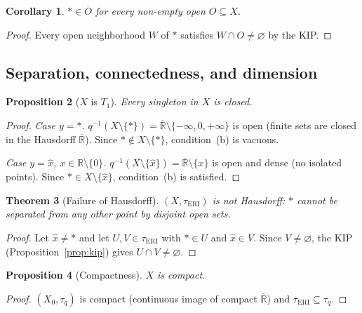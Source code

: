 \documentclass[11pt]{article}
\newtheorem{theorem}{Theorem}[section]
\newtheorem{proposition}[theorem]{Proposition}
\newtheorem{corollary}[theorem]{Corollary}
\theoremstyle{definition}
\theoremstyle{remark}
\begin{document}
\begin{corollary}\label{cor:pclosure}
$\ast \in \overline{O}$ for every non-empty open
$O \subseteq X$.
\end{corollary}
\begin{proof}
Every open neighborhood $W$ of $\ast$ satisfies
$W \cap O \neq \varnothing$ by the KIP.
\end{proof}

\subsection{Separation, connectedness, and dimension}\label{sec:separation}

\begin{proposition}[$X$ is $T_1$]\label{prop:T1}
Every singleton in $X$ is closed.
\end{proposition}
\begin{proof}
\emph{Case $y = \ast$.}\;
$q^{-1}(X\setminus\{\ast\}) =
\overline{\mathbb{R}}\setminus\{-\infty,0,+\infty\}$ is open
(finite sets are closed in the Hausdorff $\overline{\mathbb{R}}$).
Since $\ast \notin X\setminus\{\ast\}$, condition~(b) is vacuous.

\emph{Case $y = \hat{x}$, $x \in \mathbb{R}\setminus\{0\}$.}\;
$q^{-1}(X\setminus\{\hat{x}\}) = \overline{\mathbb{R}}\setminus\{x\}$
is open and dense (no isolated points).
Since $\ast \in X\setminus\{\hat{x}\}$, condition~(b) is satisfied.
\end{proof}

\begin{theorem}[Failure of Hausdorff]\label{thm:nothausdorff}
$(X, \tau_{\mathrm{ERI}})$ is not Hausdorff: $\ast$ cannot be separated
from any other point by disjoint open sets.
\end{theorem}
\begin{proof}
Let $\hat{x} \neq \ast$ and let $U, V \in \tau_{\mathrm{ERI}}$ with
$\ast \in U$ and $\hat{x} \in V$.
Since $V \neq \varnothing$, the KIP (Proposition~\ref{prop:kip})
gives $U \cap V \neq \varnothing$.
\end{proof}

\begin{proposition}[Compactness]\label{prop:compact}
$X$ is compact.
\end{proposition}
\begin{proof}
$(X_0, \tau_q)$ is compact (continuous image of compact
$\overline{\mathbb{R}}$) and $\tau_{\mathrm{ERI}} \subseteq \tau_q$.
\end{proof}
\end{document}
